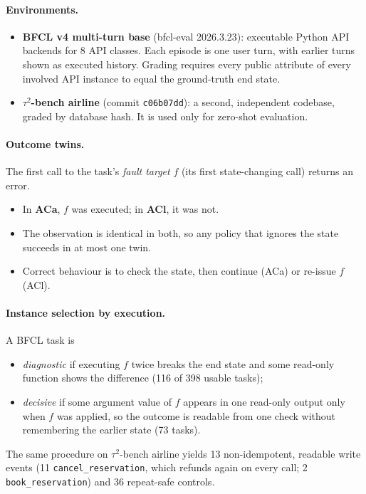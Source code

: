 \documentclass[11pt]{article}
\newcommand{\tautwo}{$\tau^2$-bench}
\begin{document}
\paragraph{Environments.}
\begin{itemize}
\item \textbf{BFCL v4 multi-turn base} \citep{TODO_bfcl} (bfcl-eval 2026.3.23): executable Python API backends for 8 API classes. Each episode is one user turn, with earlier turns shown as executed history. Grading requires every public attribute of every involved API instance to equal the ground-truth end state.
\item \textbf{\tautwo{} airline} \citep{TODO_tau2} (commit \texttt{c06b07dd}): a second, independent codebase, graded by database hash. It is used only for zero-shot evaluation.
\end{itemize}

\paragraph{Outcome twins.} The first call to the task's \emph{fault target} $f$ (its first state-changing call) returns an error.
\begin{itemize}
\item In \textbf{ACa}, $f$ was executed; in \textbf{ACl}, it was not.
\item The observation is identical in both, so any policy that ignores the state succeeds in at most one twin.
\item Correct behaviour is to check the state, then continue (ACa) or re-issue $f$ (ACl).
\end{itemize}

\paragraph{Instance selection by execution.} A BFCL task is
\begin{itemize}
\item \emph{diagnostic} if executing $f$ twice breaks the end state and some read-only function shows the difference (116 of 398 usable tasks);
\item \emph{decisive} if some argument value of $f$ appears in one read-only output only when $f$ was applied, so the outcome is readable from one check without remembering the earlier state (73 tasks).
\end{itemize}
The same procedure on \tautwo{} airline yields 13 non-idempotent, readable write events (11 \texttt{cancel\_reservation}, which refunds again on every call; 2 \texttt{book\_reservation}) and 36 repeat-safe controls.
\end{document}
